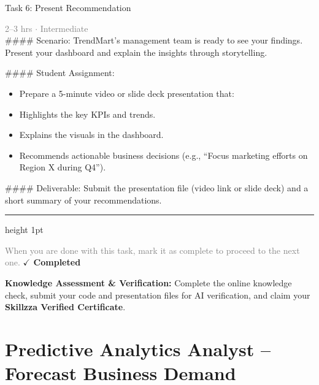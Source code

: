 \documentclass[10pt,a4paper]{article}
\begin{document}
\begin{taskbox}{Task 6: Present Recommendation}

    {\small \textcolor{gray}{2--3 hrs $\cdot$ Intermediate}}\\[12pt]

    \#\#\#\# Scenario:
TrendMart’s management team is ready to see your findings. Present your dashboard and explain the insights through storytelling.

\#\#\#\# Student Assignment:
\begin{itemize}
    \item Prepare a 5-minute video or slide deck presentation that:
    \item Highlights the key KPIs and trends.
    \item Explains the visuals in the dashboard.
    \item Recommends actionable business decisions (e.g., “Focus marketing efforts on Region X during Q4”).
\end{itemize}

\#\#\#\# Deliverable:
Submit the presentation file (video link or slide deck) and a short summary of your recommendations.\par

    \vspace{16pt}

    \textcolor{cardBorder}{\hrule height 1pt}\vspace{8pt}

    \small \textcolor{gray}{When you are done with this task, mark it as complete to proceed to the next one.} \hfill \textbf{\textcolor{brandDark}{$\checkmark$ Completed}}

\end{taskbox}

\begin{completionbox}
    \textbf{Knowledge Assessment \& Verification:} Complete the online knowledge check, submit your code and presentation files for AI verification, and claim your \textbf{Skillzza Verified Certificate}.
\end{completionbox}

\newpage




\section*{Predictive Analytics Analyst – Forecast Business Demand}
\end{document}
